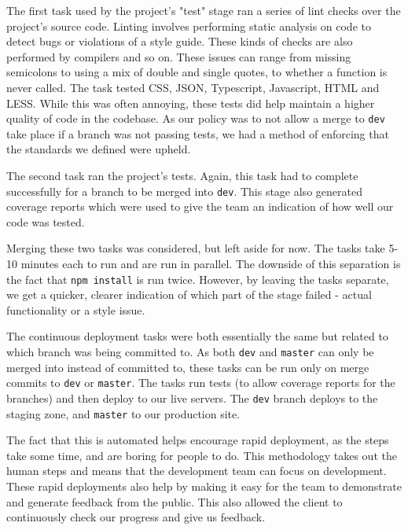 \documentclass{l3proj}
\begin{document}
The first task used by the project's "test" stage ran a series of lint checks over the
 project's source code. Linting involves performing static analysis on code to detect bugs
 or violations of a style guide. These kinds of checks are also performed by compilers and
 so on. These issues can range from missing semicolons to using a mix of
 double and single quotes, to whether a function is never called. The task tested CSS,
 JSON, Typescript, Javascript,  HTML and LESS. While this was often annoying, these tests
 did help maintain a higher quality of code in the codebase. As our policy was to not allow a
 merge to \texttt{dev} take place if a branch was not passing tests, we had a method of
 enforcing that the standards we defined were upheld.

The second task ran the project's tests. Again, this task had to complete successfully 
 for a branch to be merged into \texttt{dev}. This stage also generated coverage reports which
 were used to give the team an indication of how well our code was tested.

 

Merging these two tasks was considered, but left aside for now. The tasks take 5-10 minutes
 each to run and are run in parallel. The downside of this separation is the fact that \texttt{npm install}
 is run twice. However, by leaving the tasks separate, we get a quicker, clearer indication
 of which part of the stage failed - actual functionality or a style issue.

 

The continuous deployment tasks were both essentially the same but related to which branch was being
 committed to. As both \texttt{dev} and \texttt{master} can only be merged into instead of committed to, these tasks can
 be run only on merge commits to \texttt{dev} or \texttt{master}. The tasks run tests (to allow coverage reports for the branches)
 and then deploy to our live servers. The \texttt{dev} branch deploys to the staging zone, and
 \texttt{master} to our production site.

The fact that this is automated helps encourage rapid deployment, as the steps take some time, and are
 boring for people to do. This methodology takes out the human steps and means that the development team
 can focus on development. These rapid deployments also help by making it easy for the team to demonstrate
 and generate feedback from the public. This also allowed the client to continuously check our progress and
 give us feedback.
\end{document}
